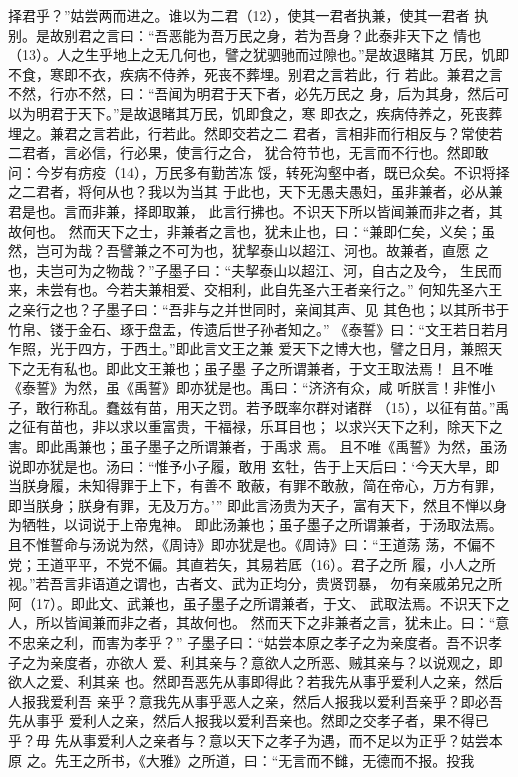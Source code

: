 \documentclass[12pt,UTF8]{ctexbook}
\begin{document}
择君乎？”姑尝两而进之。谁以为二君（12），使其一君者执兼，使其一君者 
执别。是故别君之言曰：“吾恶能为吾万民之身，若为吾身？此泰非天下之 
情也（13）。人之生乎地上之无几何也，譬之犹驷驰而过隙也。”是故退睹其 
万民，饥即不食，寒即不衣，疾病不侍养，死丧不葬埋。别君之言若此，行 
若此。兼君之言不然，行亦不然，曰：“吾闻为明君于天下者，必先万民之 
身，后为其身，然后可以为明君于天下。”是故退睹其万民，饥即食之，寒 
即衣之，疾病侍养之，死丧葬埋之。兼君之言若此，行若此。然即交若之二 
君者，言相非而行相反与？常使若二君者，言必信，行必果，使言行之合， 
犹合符节也，无言而不行也。然即敢问：今岁有疠疫（14），万民多有勤苦冻 
馁，转死沟壑中者，既已众矣。不识将择之二君者，将何从也？我以为当其 
于此也，天下无愚夫愚妇，虽非兼者，必从兼君是也。言而非兼，择即取兼， 
此言行拂也。不识天下所以皆闻兼而非之者，其故何也。 
然而天下之士，非兼者之言也，犹未止也，曰：“兼即仁矣，义矣；虽 
然，岂可为哉？吾譬兼之不可为也，犹挈泰山以超江、河也。故兼者，直愿 
之也，夫岂可为之物哉？”子墨子曰：“夫挈泰山以超江、河，自古之及今， 
生民而来，未尝有也。今若夫兼相爱、交相利，此自先圣六王者亲行之。” 
何知先圣六王之亲行之也？子墨子曰：“吾非与之并世同时，亲闻其声、见 
其色也；以其所书于竹帛、镂于金石、琢于盘盂，传遗后世子孙者知之。” 
《泰誓》曰：“文王若日若月乍照，光于四方，于西土。”即此言文王之兼 
爱天下之博大也，譬之日月，兼照天下之无有私也。即此文王兼也；虽子墨 
子之所谓兼者，于文王取法焉！ 
且不唯《泰誓》为然，虽《禹誓》即亦犹是也。禹曰：“济济有众，咸 
听朕言！非惟小子，敢行称乱。蠢兹有苗，用天之罚。若予既率尔群对诸群 
（15），以征有苗。”禹之征有苗也，非以求以重富贵，干福禄，乐耳目也； 
以求兴天下之利，除天下之害。即此禹兼也；虽子墨子之所谓兼者，于禹求 
焉。 
且不唯《禹誓》为然，虽汤说即亦犹是也。汤曰：“惟予小子履，敢用 
玄牡，告于上天后曰：‘今天大旱，即当朕身履，未知得罪于上下，有善不 
敢蔽，有罪不敢赦，简在帝心，万方有罪，即当朕身；朕身有罪，无及万方。’” 
即此言汤贵为天子，富有天下，然且不惮以身为牺牲，以词说于上帝鬼神。 
即此汤兼也；虽子墨子之所谓兼者，于汤取法焉。 
且不惟誓命与汤说为然，《周诗》即亦犹是也。《周诗》曰：“王道荡 
荡，不偏不党；王道平平，不党不偏。其直若矢，其易若厎（16）。君子之所 
履，小人之所视。”若吾言非语道之谓也，古者文、武为正均分，贵贤罚暴， 
勿有亲戚弟兄之所阿（17）。即此文、武兼也，虽子墨子之所谓兼者，于文、 
武取法焉。不识天下之人，所以皆闻兼而非之者，其故何也。 
然而天下之非兼者之言，犹未止。曰：“意不忠亲之利，而害为孝乎？” 
子墨子曰：“姑尝本原之孝子之为亲度者。吾不识孝子之为亲度者，亦欲人 
爱、利其亲与？意欲人之所恶、贼其亲与？以说观之，即欲人之爱、利其亲 
也。然即吾恶先从事即得此？若我先从事乎爱利人之亲，然后人报我爱利吾 
亲乎？意我先从事乎恶人之亲，然后人报我以爱利吾亲乎？即必吾先从事乎 
爱利人之亲，然后人报我以爱利吾亲也。然即之交孝子者，果不得已乎？毋 
先从事爱利人之亲者与？意以天下之孝子为遇，而不足以为正乎？姑尝本原 
之。先王之所书，《大雅》之所道，曰：“无言而不雠，无德而不报。投我 
\end{document}
